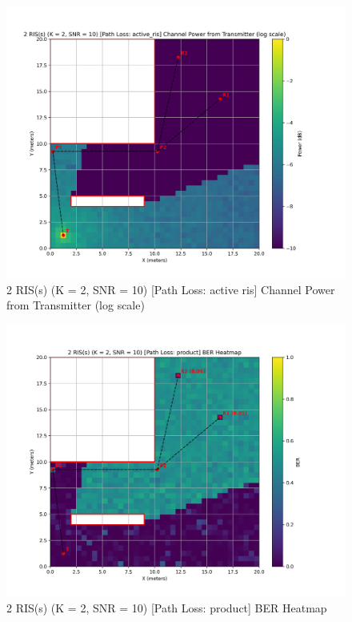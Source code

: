 \begin{figure}[H]
  \centering
  \includegraphics[width=0.8\linewidth]{imgs/heatmap-simulations/2 RIS(s) (K = 2, SNR = 10) [Path Loss_ active_ris] Channel Power from Transmitter (log scale).png}
  \caption{2 RIS(s) (K = 2, SNR = 10) [Path Loss: active ris] Channel Power from Transmitter (log scale)}
\end{figure}


\begin{figure}[H]
  \centering
  \includegraphics[width=0.8\linewidth]{imgs/heatmap-simulations/2 RIS(s) (K = 2, SNR = 10) [Path Loss_ product] BER Heatmap.png}
  \caption{2 RIS(s) (K = 2, SNR = 10) [Path Loss: product] BER Heatmap}
\end{figure}

